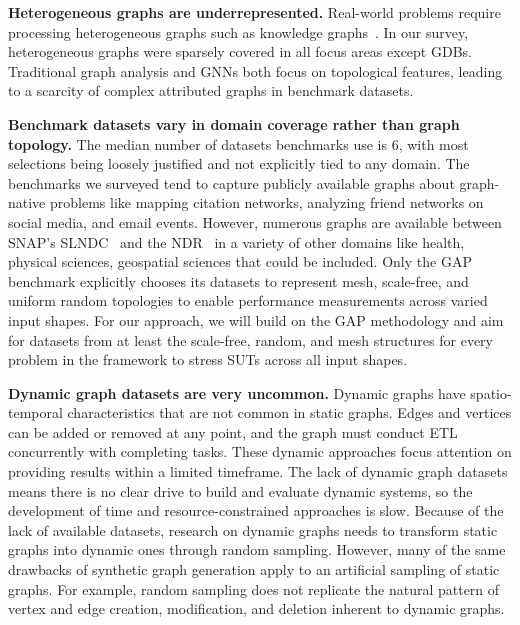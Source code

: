 \textbf{Heterogeneous graphs are underrepresented.}
Real-world \gai problems require processing heterogeneous graphs such as knowledge graphs~\cite{Regli2022a}.
In our survey, heterogeneous graphs were sparsely covered in all focus areas except \ac{GDB}s.
Traditional graph analysis and \ac{GNN}s both focus on topological features, leading to a scarcity of complex attributed graphs in benchmark datasets.

\textbf{Benchmark datasets vary in domain coverage rather than graph topology.} 
The median number of datasets benchmarks use is $6$, with most selections being loosely justified and not explicitly tied to any domain.
The benchmarks we surveyed tend to capture publicly available graphs about graph-native problems like mapping citation networks, analyzing friend networks on social media, and email events. 
However, numerous graphs are available between \ac{SNAP}'s \ac{SLNDC}~\cite{Leskovec2014} and the \ac{NDR}~\cite{Rossi2015} in a variety of other domains like health, physical sciences, geospatial sciences that could be included. 
Only the \ac{GAP}~\cite{Beamer2017} benchmark explicitly chooses its datasets to represent mesh, scale-free, and uniform random topologies to enable performance measurements across varied input shapes.
For our approach, we will build on the \ac{GAP} methodology and aim for datasets from at least the scale-free, random, and mesh structures for every problem in the framework to stress \ac{SUT}s across all input shapes. 

\textbf{Dynamic graph datasets are very uncommon.}
Dynamic graphs have spatio-temporal characteristics that are not common in static graphs. 
Edges and vertices can be added or removed at any point, and the graph must conduct \ac{ETL} concurrently with completing \gai tasks.
These dynamic approaches focus attention on providing results within a limited timeframe.
The lack of dynamic graph datasets means there is no clear drive to build and evaluate dynamic \gai systems, so the development of time and resource-constrained \gai approaches is slow.
Because of the lack of available datasets, research on dynamic graphs needs to transform static graphs into dynamic ones through random sampling.
However, many of the same drawbacks of synthetic graph generation apply to an artificial sampling of static graphs. 
For example, random sampling does not replicate the natural pattern of vertex and edge creation, modification, and deletion inherent to dynamic graphs.

